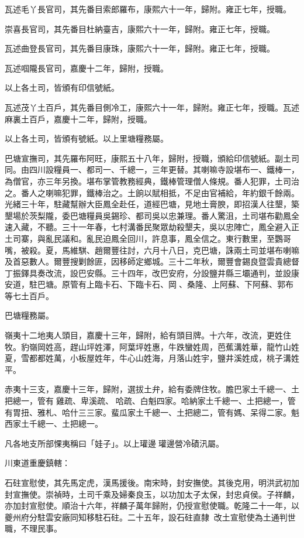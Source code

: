 \begin{pinyinscope}
瓦述毛丫長官司，其先番目索郎羅布，康熙六十一年，歸附。雍正七年，授職。

崇喜長官司，其先番目杜納臺吉，康熙六十一年，歸附。雍正七年，授職。

瓦述曲登長官司，其先番目康珠，康熙六十一年，歸附。雍正七年，授職。

瓦述啯隴長官司，嘉慶十二年，歸附，授職。

以上各土司，皆頒有印信號紙。

瓦述茂丫土百戶，其先番目側冷工，康熙六十一年，歸附。雍正七年，授職。瓦述麻裏土百戶，嘉慶十二年，歸附，授職。

以上各土司，皆頒有號紙。以上里塘糧務屬。

巴塘宣撫司，其先羅布阿旺，康熙五十八年，歸附，授職，頒給印信號紙。副土司同。由四川設糧員一、都司一、千總一，三年更替。其喇嘛寺設堪布一、鐵棒一，為僧官，亦三年另換。堪布掌管教務經典，鐵棒管理僧人條規。番人犯罪，土司治之。番人之喇嘛犯罪，鐵棒治之。土餉以賦相抵，不足由官補給，年約銀千餘兩。光緒三十年，駐藏幫辦大臣鳳全赴任，道經巴塘，見地土膏腴，即招漢人往墾，築墾場於茨梨隴，委巴塘糧員吳錫珍、都司吳以忠兼理。番人驚沮，土司堪布勸鳳全速入藏，不聽。三十一年春，七村溝番民聚眾劫殺墾夫，吳以忠陣亡，鳳全避入正土司寨，與亂民議和。亂民迫鳳全回川，許息事，鳳全信之。東行數里，至鸚哥嘴，被殺。夏，馬維騏、趙爾豐往討，六月十八日，克巴塘，誅兩土司並堪布喇嘛及首惡數人。爾豐搜剿餘匪，因移師定鄉城。三十二年秋，爾豐會錫良暨雲貴總督丁振鐸具奏改流，設巴安縣。三十四年，改巴安府，分設鹽井縣三壩通判，並設康安道，駐巴塘。原管有上臨卡石、下臨卡石、岡、桑隆、上阿蘇、下阿蘇、郭布等七土百戶。

巴塘糧務屬。

嶺夷十二地夷人頭目，嘉慶十三年，歸附，給有頭目牌。十六年，改流，更姓住牧。豹嶺岡姓高，趕山坪姓澤，阿葉坪姓惠，牛跌蠻姓周，芭蕉溝姓華，龍竹山姓夏，雪都都姓萬，小板屋姓年，牛心山姓海，月落山姓宇，鹽井溪姓成，桃子溝姓平。

赤夷十三支，嘉慶十三年，歸附，選拔土弁，給有委牌住牧。膽巴家土千總一、土把總一，管有雞疏、卑溪疏、哈疏、白魁四家。哈納家土千總一、土把總一，管有胃扭、雅札、哈什三三家。蜚瓜家土千總一、土把總二，管有媽、呆得二家。魁西家土千總一、土把總一。

凡各地支所部惈夷稱曰「娃子」。以上瓘邊瓘邊營冷磧汛屬。

川東道重慶鎮轄：

石砫宣慰使，其先馬定虎，漢馬援後。南宋時，封安撫使。其後克用，明洪武初加封宣撫使。崇禎時，土司千乘及婦秦良玉，以功加太子太保，封忠貞侯。子祥麟，亦加封宣慰使。順治十六年，祥麟子萬年歸附，仍授宣慰使職。乾隆二十一年，以夔州府分駐雲安廠同知移駐石砫。二十五年，設石砫直隸，改土宣慰使為土通判世職，不理民事。


\end{pinyinscope}
